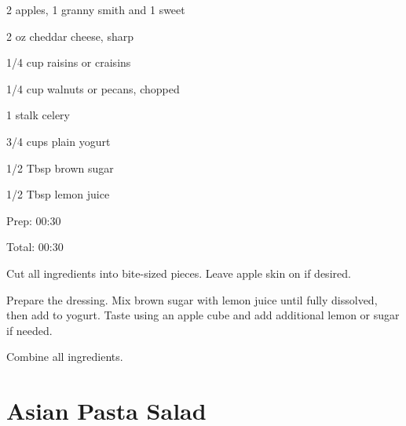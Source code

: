 \documentclass[oneside]{book}  %
\def\thisrecipe{}  %
\newcommand{\recipe}[1]{\section{#1}\def\thisrecipe{: #1}} %
\begin{document}
\begin{IT}
  \begin{ingredients}[serves=4]
  \item[2] apples, 1 granny smith and 1 sweet
  \item[2 oz] cheddar cheese, sharp
  \item[1/4 cup] raisins or craisins
  \item[1/4 cup] walnuts or pecans, chopped
  \item[1 stalk] celery
  \item[3/4 cups] plain yogurt
  \item[1/2 Tbsp] brown sugar
  \item[1/2 Tbsp] lemon juice
  \end{ingredients}

  \switchcolumn

  \begin{timeline}
    \item[Prep:]  00:30
    \item[Total:] 00:30
  \end{timeline}
\end{IT}

\begin{directions}
  \item Cut all ingredients into bite-sized pieces. Leave apple skin on if
  desired.

  \item Prepare the dressing. Mix brown sugar with lemon juice until fully
  dissolved, then add to yogurt. Taste using an apple cube and add additional
  lemon or sugar if needed.

  \item Combine all ingredients.
\end{directions}
\recipe{Asian Pasta Salad} \label{recipe:asian_pasta_salad} %
 
\end{document}
